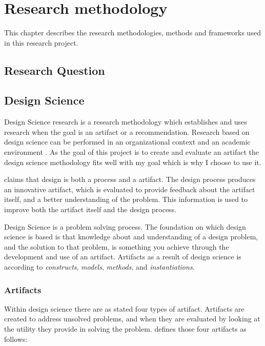 \documentclass[../Main/thesis.tex]{subfiles}
\begin{document}
\chapter{Research methodology}
\label{ch:research_methodology}
This chapter describes the research methodologies, methods and frameworks used in this research project.

\section{Research Question}


\section{Design Science}
Design Science research is a research methodology which establishes and uses research when the goal is an artifact or a recommendation.
Research based on design science can be performed in an organizational context and an academic environment \citep{lacerda2015design}.
As the goal of this project is to create and evaluate an artifact the design science methodology fits well with my goal which is why I choose to use it.

\citet{hevner2004design} claims that design is both a process and a artifact.
The design process produces an innovative artifact, which is evaluated to provide feedback about the artifact itself, and a better understanding of the problem. 
This information is used to improve both the artifact itself and the design process.

Design Science is a problem solving process.
The foundation on which design science is based is that knowledge about and understanding of a design problem, and the solution to that problem, is something you achieve through the development and use of an artifact.
Artifacts as a result of design science is according to \citet{March1995} \textit{constructs}, \textit{models}, \textit{methods}, and \textit{instantiations}.


\subsection{Artifacts}
Within design science there are as stated four types of artifact.
Artifacts are created to address unsolved problems, and when they are evaluated by looking at the utility they provide in solving the problem.
\citet[p.78-79]{hevner2004design} defines those four artifacts as follows:
\end{document}
